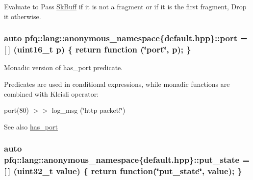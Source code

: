 Evaluate to {\ttfamily Pass} \hyperlink{structpfq_1_1lang_1_1SkBuff}{Sk\+Buff} if it is not a fragment or if it is the first fragment, {\ttfamily Drop} it otherwise. 

\subsubsection[{\texorpdfstring{port}{port}}]{\setlength{\rightskip}{0pt plus 5cm}auto pfq\+::lang\+::anonymous\+\_\+namespace\{default.\+hpp\}\+::port = \mbox{[}$\,$\mbox{]} (uint16\+\_\+t p) \{ return {\bf function} (\char`\"{}port\char`\"{}, p); \}}\hypertarget{namespacepfq_1_1lang_1_1anonymous__namespace_02default_8hpp_03_a868eca03290a037cb4e9b7075085888b}{}\label{namespacepfq_1_1lang_1_1anonymous__namespace_02default_8hpp_03_a868eca03290a037cb4e9b7075085888b}


Monadic version of {\ttfamily has\+\_\+port} predicate. 

Predicates are used in conditional expressions, while monadic functions are combined with Kleisli operator\+:

port(80) $>$$>$ log\+\_\+msg (\char`\"{}http packet!\char`\"{})

\begin{DoxySeeAlso}{See also}
\hyperlink{namespacepfq_1_1lang_1_1anonymous__namespace_02default_8hpp_03_a9f7161b8dfb842c5a845f413eb6bc82f}{has\+\_\+port} 
\end{DoxySeeAlso}
\subsubsection[{\texorpdfstring{put\+\_\+state}{put_state}}]{\setlength{\rightskip}{0pt plus 5cm}auto pfq\+::lang\+::anonymous\+\_\+namespace\{default.\+hpp\}\+::put\+\_\+state = \mbox{[}$\,$\mbox{]} (uint32\+\_\+t value) \{ return {\bf function}(\char`\"{}put\+\_\+state\char`\"{}, value); \}}\hypertarget{namespacepfq_1_1lang_1_1anonymous__namespace_02default_8hpp_03_afd94f51db878b2f70225c944c3f1d300}{}\label{namespacepfq_1_1lang_1_1anonymous__namespace_02default_8hpp_03_afd94f51db878b2f70225c944c3f1d300}


